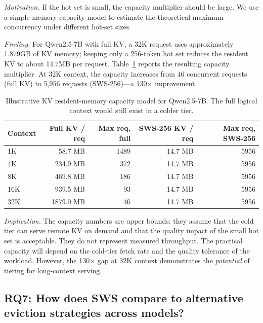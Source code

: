\documentclass[11pt]{article}
\theoremstyle{definition}
\theoremstyle{plain}
\begin{document}
\emph{Motivation.}  If the hot set is small, the capacity multiplier should be large.  We use a simple memory-capacity model to estimate the theoretical maximum concurrency under different hot-set sizes.

\emph{Finding.}  For Qwen2.5-7B with full KV, a 32K request uses approximately 1.879GB of KV memory; keeping only a 256-token hot set reduces the resident KV to about 14.7MB per request.  Table~\ref{tab:capacity} reports the resulting capacity multiplier.  At 32K context, the capacity increases from 46 concurrent requests (full KV) to 5{,}956 requests (SWS-256)---a 130$\times$ improvement.

\begin{table}[t]
\centering
\caption{Illustrative KV resident-memory capacity model for Qwen2.5-7B.  The full logical context would still exist in a colder tier.}
\label{tab:capacity}
\small
\begin{tabular}{lrrrr}
\toprule
Context & Full KV / req & Max req, full & SWS-256 KV / req & Max req, SWS-256 \\
\midrule
1K & 58.7 MB & 1489 & 14.7 MB & 5956 \\
4K & 234.9 MB & 372 & 14.7 MB & 5956 \\
8K & 469.8 MB & 186 & 14.7 MB & 5956 \\
16K & 939.5 MB & 93 & 14.7 MB & 5956 \\
32K & 1879.0 MB & 46 & 14.7 MB & 5956 \\
\bottomrule
\end{tabular}
\end{table}

\emph{Implication.}  The capacity numbers are upper bounds: they assume that the cold tier can serve remote KV on demand and that the quality impact of the small hot set is acceptable.  They do not represent measured throughput.  The practical capacity will depend on the cold-tier fetch rate and the quality tolerance of the workload.  However, the 130$\times$ gap at 32K context demonstrates the \emph{potential} of tiering for long-context serving.


\subsection{RQ7: How does SWS compare to alternative eviction strategies across models?}
\label{sec:rq7}
\end{document}
